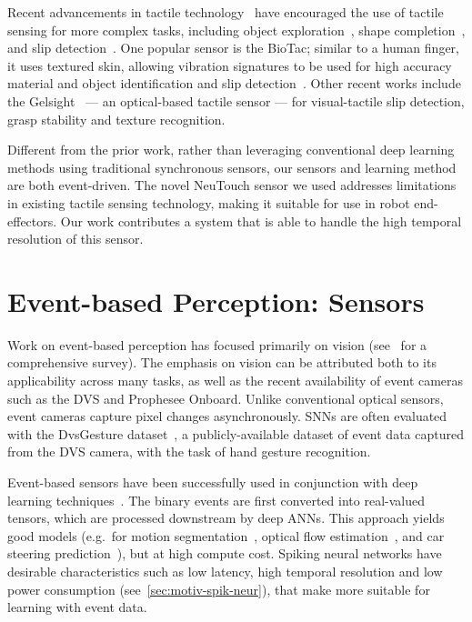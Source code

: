 \documentclass[fyp]{socreport}
\begin{document}
Recent advancements in tactile technology~\cite{shan2017robotic} have encouraged
the use of tactile sensing for more complex tasks, including object
exploration~\cite{liu2016visual}, shape completion~\cite{varley2017visual}, and
slip detection~\cite{reinecke2014experimental,calandra2018more}. One popular
sensor is the BioTac; similar to a human finger, it uses textured skin, allowing
vibration signatures to be used for high accuracy material and object
identification and slip detection~\cite{su2015force}. Other recent works include
the Gelsight~\cite{yuan2017gelsight} --- an optical-based tactile sensor --- for
visual-tactile slip detection, grasp stability and texture recognition.

Different from the prior work, rather than leveraging conventional deep learning
methods using traditional synchronous sensors, our sensors and learning method
are both event-driven. The novel NeuTouch sensor we used addresses limitations
in existing tactile sensing technology, making it suitable for use in robot
end-effectors. Our work contributes a system that is able to handle the high
temporal resolution of this sensor.

\section{Event-based Perception: Sensors}

Work on event-based perception has focused primarily on vision
(see~\cite{Gallego2018} for a comprehensive survey). The emphasis on vision can
be attributed both to its applicability across many tasks, as well as the recent
availability of event cameras such as the DVS and Prophesee Onboard. Unlike
conventional optical sensors, event cameras capture pixel changes
asynchronously. SNNs are often evaluated with the DvsGesture
dataset~\cite{dvsgesture}, a publicly-available dataset of event data captured
from the DVS camera, with the task of hand gesture recognition.

Event-based sensors have been successfully used in conjunction with deep
learning techniques~\cite{Gallego2018}. The binary events are first converted
into real-valued tensors, which are processed downstream by deep ANNs. This
approach yields good models (e.g.\ for motion segmentation~\cite{Mitrokhin2019}, optical flow
estimation~\cite{zhu2018ev}, and car steering
prediction~\cite{maqueda2018event}), but at high compute cost. Spiking neural
networks have desirable characteristics such as low latency, high temporal
resolution and low power consumption (see~\autoref{sec:motiv-spik-neur}),
that make more suitable for learning with event data.
\end{document}
